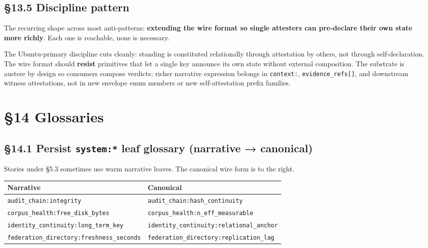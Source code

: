 \documentclass[10pt]{article}
\begin{document}
\subsection*{§13.5 Discipline pattern}


The recurring shape across most anti-patterns: \textbf{extending the wire format so single attesters can pre-declare their own state more richly}. Each one is reachable, none is necessary.


The Ubuntu-primary discipline cuts cleanly: standing is constituted relationally through attestation by others, not through self-declaration. The wire format should \textbf{resist} primitives that let a single key announce its own state without external composition. The substrate is austere by design so consumers compose verdicts; richer narrative expression belongs in \texttt{context:}, \texttt{evidence\_refs[]}, and downstream witness attestations, not in new envelope enum members or new self-attestation prefix families.




\clearpage


\section*{§14 Glossaries}


\subsection*{§14.1 Persist \texttt{system:*} leaf glossary (narrative → canonical)}


Stories under §5.3 sometimes use warm narrative leaves. The canonical wire form is to the right.


{\footnotesize
\begin{longtable}{|p{8.0cm}|p{8.0cm}|}\hline
\textbf{Narrative} & \textbf{Canonical} \\ \hline\endhead
\texttt{audit\_chain:integrity} & \texttt{audit\_chain:hash\_continuity} \\ \hline
\texttt{corpus\_health:free\_disk\_bytes} & \texttt{corpus\_health:n\_eff\_measurable} \\ \hline
\texttt{identity\_continuity:long\_term\_key} & \texttt{identity\_continuity:relational\_anchor} \\ \hline
\texttt{federation\_directory:freshness\_seconds} & \texttt{federation\_directory:replication\_lag} \\ \hline
\end{longtable}}
\end{document}

